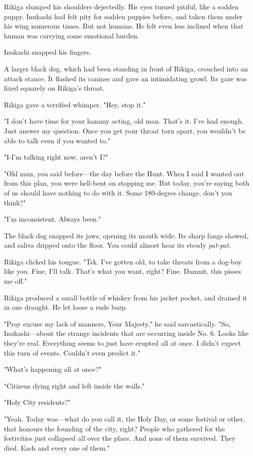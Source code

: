 Rikiga slumped his shoulders dejectedly. His eyes turned pitiful, like a
sodden puppy. Inukashi had felt pity for sodden puppies before, and
taken them under his wing numerous times. But not humans. He felt even
less inclined when that human was carrying some emotional burden.

Inukashi snapped his fingers.

A larger black dog, which had been standing in front of Rikiga, crouched
into an attack stance. It flashed its canines and gave an intimidating
growl. Its gaze was fixed squarely on Rikiga's throat.

Rikiga gave a terrified whimper. "Hey, stop it."

"I don't have time for your hammy acting, old man. That's it. I've had
enough. Just answer my question. Once you get your throat torn apart,
you wouldn't be able to talk even if you wanted to."

"I-I'm talking right now, aren't I?"

"Old man, you said before---the day before the Hunt. When I said I wanted
out from this plan, you were hell-bent on stopping me. But today, you're
saying both of us should have nothing to do with it. Some 180-degree
change, don't you think?"

"I'm inconsistent. Always been."

The black dog snapped its jaws, opening its mouth wide. Its sharp fangs
showed, and saliva dripped onto the floor. You could almost hear its
steady \emph{pat-pat}.

Rikiga clicked his tongue. "Tsk. I've gotten old, to take threats from a
dog-boy like you. Fine, I'll talk. That's what you want, right? Fine.
Damnit, this pisses me off."

Rikiga produced a small bottle of whiskey from his jacket pocket, and
drained it in one draught. He let loose a rude burp.

"Pray excuse my lack of manners, Your Majesty," he said sarcastically.
"So, Inukashi---about the strange incidents that are occurring inside No.
6. Looks like they're real. Everything seems to just have erupted all at
once. I didn't expect this turn of events. Couldn't even predict it."

"What's happening all at once?"

"Citizens dying right and left inside the walls."

"Holy City residents?"

"Yeah. Today was---what do you call it, the Holy Day, or some festival or
other, that honours the founding of the city, right? People who gathered
for the festivities just collapsed all over the place. And none of them
survived. They died. Each and every one of them."

